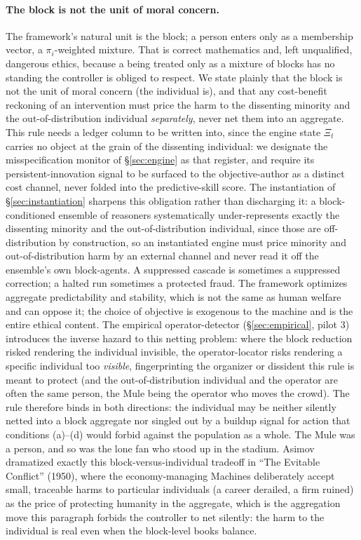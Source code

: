 \documentclass[11pt]{article}
\begin{document}
\paragraph{The block is not the unit of moral concern.} The framework's natural unit is the block; a person enters only as a membership vector, a $\pi_i$-weighted mixture. That is correct mathematics and, left unqualified, dangerous ethics, because a being treated only as a mixture of blocks has no standing the controller is obliged to respect. We state plainly that the block is not the unit of moral concern (the individual is), and that any cost-benefit reckoning of an intervention must price the harm to the dissenting minority and the out-of-distribution individual \emph{separately}, never net them into an aggregate. This rule needs a ledger column to be written into, since the engine state $\Xi_t$ carries no object at the grain of the dissenting individual: we designate the misspecification monitor of \S\ref{sec:engine} as that register, and require its persistent-innovation signal to be surfaced to the objective-author as a distinct cost channel, never folded into the predictive-skill score. The instantiation of \S\ref{sec:instantiation} sharpens this obligation rather than discharging it: a block-conditioned ensemble of reasoners systematically under-represents exactly the dissenting minority and the out-of-distribution individual, since those are off-distribution by construction, so an instantiated engine must price minority and out-of-distribution harm by an external channel and never read it off the ensemble's own block-agents. A suppressed cascade is sometimes a suppressed correction; a halted run sometimes a protected fraud. The framework optimizes aggregate predictability and stability, which is not the same as human welfare and can oppose it; the choice of objective is exogenous to the machine and is the entire ethical content. The empirical operator-detector (\S\ref{sec:empirical}, pilot 3) introduces the inverse hazard to this netting problem: where the block reduction risked rendering the individual invisible, the operator-locator risks rendering a specific individual too \emph{visible}, fingerprinting the organizer or dissident this rule is meant to protect (and the out-of-distribution individual and the operator are often the same person, the Mule being the operator who moves the crowd). The rule therefore binds in both directions: the individual may be neither silently netted into a block aggregate nor singled out by a buildup signal for action that conditions (a)--(d) would forbid against the population as a whole. The Mule was a person, and so was the lone fan who stood up in the stadium. Asimov dramatized exactly this block-versus-individual tradeoff in ``The Evitable Conflict'' (1950), where the economy-managing Machines deliberately accept small, traceable harms to particular individuals (a career derailed, a firm ruined) as the price of protecting humanity in the aggregate, which is the aggregation move this paragraph forbids the controller to net silently: the harm to the individual is real even when the block-level books balance.
\end{document}
